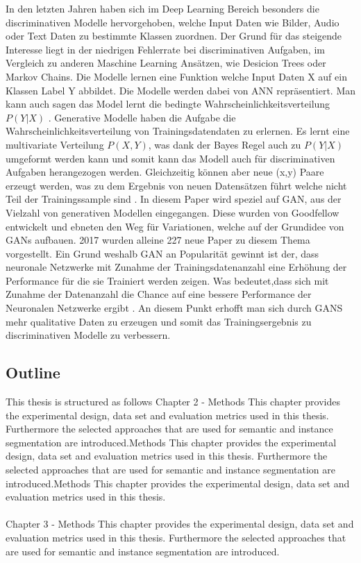 \documentclass{llncs}
\begin{document}
In den letzten Jahren haben sich im Deep Learning Bereich besonders die discriminativen Modelle hervorgehoben, welche Input Daten wie Bilder, Audio oder Text Daten zu bestimmte Klassen zuordnen. Der Grund für das steigende Interesse liegt in der niedrigen Fehlerrate bei discriminativen Aufgaben, im Vergleich zu anderen Maschine Learning Ansätzen, wie Desicion Trees oder Markov Chains\cite{Grundlagen}. Die Modelle lernen eine Funktion welche Input Daten X auf ein Klassen Label Y abbildet. Die Modelle werden dabei von ANN repräsentiert. Man kann auch sagen das Model lernt die bedingte Wahrscheinlichkeitsverteilung $P(Y|X)$ \cite{discrim}. Generative Modelle haben die Aufgabe die Wahrscheinlichkeitsverteilung von Trainingsdatendaten zu erlernen. Es lernt eine multivariate Verteilung $P(X,Y)$, was dank der Bayes Regel auch zu $P(Y|X)$ umgeformt werden kann und somit kann das Modell auch für discriminativen Aufgaben herangezogen werden. Gleichzeitig können aber neue (x,y) Paare erzeugt werden, was zu dem Ergebnis von neuen Datensätzen führt welche nicht Teil der Trainingssample sind \cite{discrim}. In diesem Paper wird speziel auf GAN, aus der Vielzahl von generativen Modellen eingegangen. Diese wurden von Goodfellow\cite{goodfellow2014} entwickelt und ebneten den Weg für Variationen, welche auf der Grundidee von GANs aufbauen. 2017 wurden alleine 227 neue Paper zu diesem Thema vorgestellt. Ein Grund weshalb GAN an Popularität gewinnt ist der, dass neuronale Netzwerke mit Zunahme der Trainingsdatenanzahl eine Erhöhung der Performance für die sie Trainiert werden zeigen. Was bedeutet,dass sich mit Zunahme der Datenanzahl die Chance auf eine bessere Performance der Neuronalen Netzwerke ergibt \cite{data}. An diesem Punkt erhofft man sich durch GANS mehr qualitative Daten zu erzeugen und somit das Trainingsergebnis zu discriminativen Modelle zu verbessern. 

\subsection{Outline}
This thesis is structured as follows Chapter 2 - Methods This chapter provides the experimental design, data set and evaluation metrics used in this thesis. Furthermore the selected approaches that are used for semantic and instance segmentation are introduced.Methods This chapter provides the experimental design, data set and evaluation metrics used in this thesis. Furthermore the selected approaches that are used for semantic and instance segmentation are introduced.Methods This chapter provides the experimental design, data set and evaluation metrics used in this thesis. 
\\\\
Chapter 3 - Methods This chapter provides the experimental design, data set and evaluation metrics used in this thesis. Furthermore the selected approaches that are used for semantic and instance segmentation are introduced.
\\\\
\end{document}
